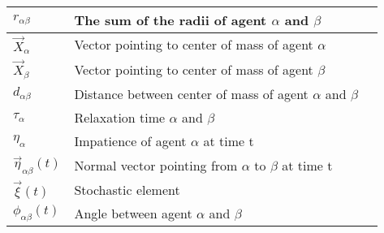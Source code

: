 \begin{center}
\begin{tabular}{lll}
\hline
$r_{\alpha \beta}$ & The sum of the radii of agent $\alpha$ and $\beta$ & \\
\hline
$\vec{X}_{\alpha}$ & Vector pointing to center of mass of agent $\alpha$ & \\
\hline
$\vec{X}_{\beta}$ & Vector pointing to center of mass of agent $\beta$ & \\
\hline
$d_{\alpha \beta}$ & Distance between center of mass of agent $\alpha$ and $\beta$ & \\
\hline
$\tau_{\alpha}$ & Relaxation time $\alpha$ and $\beta$ & \\
\hline
$\eta_{\alpha}$ & Impatience of agent $\alpha$ at time t & \\
\hline
$\vec{\eta}_{\alpha \beta}\left( t \right)$ & Normal vector pointing from $\alpha$ to $\beta$ at time t & \\
\hline
$\vec{\xi}\left( t \right)$ & Stochastic element & \\
\hline
$\phi_{\alpha \beta} \left( t \right)$ & Angle between agent $\alpha$ and $\beta$ & \\
\hline

\end{tabular}
\end{center}

\clearpage

